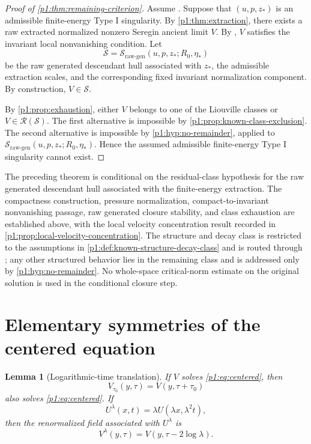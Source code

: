 \documentclass[11pt]{amsart}
\theoremstyle{plain}
\newtheorem{lemma}[lemma]{Lemma}
\theoremstyle{definition}
\theoremstyle{remark}
\numberwithin{equation}{section}
\newcommand{\calS}{\mathcal S}
\newcommand{\calR}{\mathcal R}
\begin{document}
\begin{proof}[Proof of \cref{p1:thm:remaining-criterion}]
Assume .
Suppose that \((u,p,z_*)\) is an admissible finite-energy Type I singularity.
By \cref{p1:thm:extraction}, there exists a raw extracted normalized nonzero
Seregin ancient limit \(V\).  By
, \(V\) satisfies the invariant
local nonvanishing condition.  Let
\[
   \calS=\calS_{\mathrm{raw\text{-}gen}}(u,p,z_*;R_0,\eta_*)
\]
be the raw generated descendant hull associated with \(z_*\), the admissible
extraction scales, and the corresponding fixed invariant normalization
component.  By construction, \(V\in\calS\).

By \cref{p1:prop:exhaustion}, either \(V\) belongs to one of the Liouville classes
or \(V\in\calR(\calS)\).  The first alternative is impossible by
\cref{p1:prop:known-class-exclusion}.  The second alternative is impossible by
\cref{p1:hyp:no-remainder}, applied to
\(\calS_{\mathrm{raw\text{-}gen}}(u,p,z_*;R_0,\eta_*)\).  Hence the assumed admissible finite-energy Type I
singularity cannot exist.
\end{proof}

The preceding theorem is conditional on the residual-class hypothesis for the
raw generated descendant hull associated with the finite-energy extraction.  The
compactness construction, pressure normalization, compact-to-invariant
nonvanishing passage, raw generated closure stability, and class exhaustion are
established above, with the local velocity concentration result recorded in
\cref{p1:prop:local-velocity-concentration}.  The structure and decay class is
restricted to the assumptions in \cref{p1:def:known-structure-decay-class} and
is routed through ; any other structured
behavior lies in the remaining class and is addressed only by
\cref{p1:hyp:no-remainder}.  No whole-space critical-norm estimate on the
original solution is used in the conditional closure step.

\section{Elementary symmetries of the centered equation}
\label{p1:app:centered-symmetries}

\begin{lemma}[Logarithmic-time translation]\label{p1:lem:tau-translation}
If \(V\) solves \eqref{p1:eq:centered}, then
\[
   V_{\tau_0}(y,\tau)=V(y,\tau+\tau_0)
\]
also solves \eqref{p1:eq:centered}.  If
\[
   U^\lambda(x,t)=\lambda U(\lambda x,\lambda^2t),
\]
then the renormalized field associated with \(U^\lambda\) is
\[
   V^\lambda(y,\tau)=V(y,\tau-2\log\lambda).
\]
\end{lemma}
\end{document}
